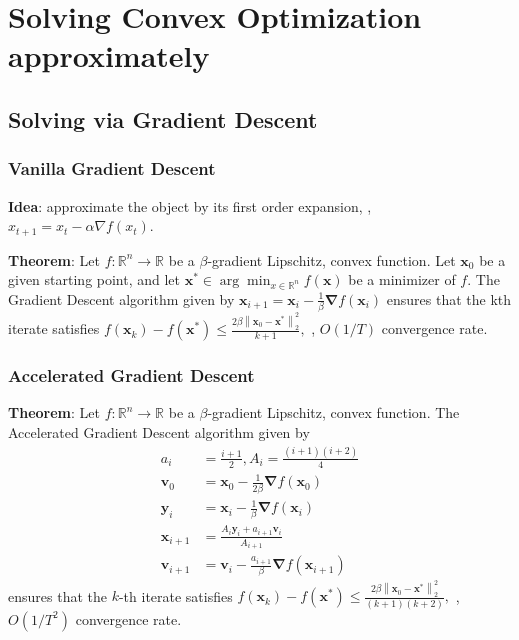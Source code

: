 \section{Solving Convex Optimization approximately}

\subsection{Solving via Gradient Descent}

\subsubsection{Vanilla Gradient Descent}

\textbf{Idea}: approximate the object by its first order expansion, \ie, $x_{t+1} = x_t - \alpha \nabla f(x_t)$.

\textbf{Theorem}: Let $f: \mathbb{R}^{n} \rightarrow \mathbb{R}$ be a $\beta$-gradient Lipschitz, convex function. Let $\boldsymbol{x}_{0}$ be a given starting point, and let $\boldsymbol{x}^{*} \in \arg \min _{x \in \mathbb{R}^{n}} f(\boldsymbol{x})$ be a minimizer of $f$. The Gradient Descent algorithm given by
$
\boldsymbol{x}_{i+1}=\boldsymbol{x}_{i}-\frac{1}{\beta} \boldsymbol{\nabla} f\left(\boldsymbol{x}_{i}\right)
$
ensures that the kth iterate satisfies
$
f\left(\boldsymbol{x}_{k}\right)-f\left(\boldsymbol{x}^{*}\right) \leq \frac{2 \beta\left\|\boldsymbol{x}_{0}-\boldsymbol{x}^{*}\right\|_{2}^{2}}{k+1},
$ \ie, $O(1/T)$ convergence rate.

\subsubsection{Accelerated Gradient Descent}
\textbf{Theorem}: Let $f: \mathbb{R}^{n} \rightarrow \mathbb{R}$ be a $\beta$-gradient Lipschitz, convex function. 
The Accelerated Gradient Descent algorithm given by
$$
\begin{aligned}
a_{i} &=\frac{i+1}{2}, A_{i}=\frac{(i+1)(i+2)}{4} \\
\boldsymbol{v}_{0} &=\boldsymbol{x}_{0}-\frac{1}{2 \beta} \boldsymbol{\nabla} f\left(\boldsymbol{x}_{0}\right) \\
\boldsymbol{y}_{i} &=\boldsymbol{x}_{i}-\frac{1}{\beta} \boldsymbol{\nabla} f\left(\boldsymbol{x}_{i}\right) \\
\boldsymbol{x}_{i+1} &=\frac{A_{i} \boldsymbol{y}_{i}+a_{i+1} \boldsymbol{v}_{i}}{A_{i+1}} \\
\boldsymbol{v}_{i+1} &=\boldsymbol{v}_{i}-\frac{a_{i+1}}{\beta} \boldsymbol{\nabla} f\left(\boldsymbol{x}_{i+1}\right)
\end{aligned}
$$
ensures that the $k$-th iterate satisfies
$
f\left(\boldsymbol{x}_{k}\right)-f\left(\boldsymbol{x}^{*}\right) \leq \frac{2 \beta\left\|\boldsymbol{x}_{0}-\boldsymbol{x}^{*}\right\|_{2}^{2}}{(k+1)(k+2)},
$ \ie, $O(1/T^2)$ convergence rate.


